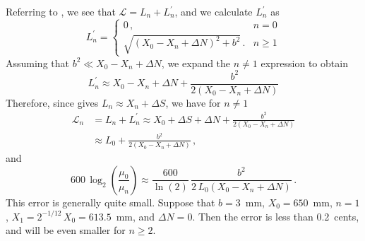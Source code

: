 Referring to , we see that $\mathcal{L} = L_n + L^\prime_n$, and we calculate $L^\prime_n$ as
 \begin{equation}
L^\prime_n = \begin{cases}
0\, , & n =  0 \\
\sqrt{\left(X_0 - X_n + \Delta N\right)^2 + b^2}\, . & n \ge 1
 \end{cases}
 \end{equation}
Assuming that $b^2 \ll X_0 - X_n + \Delta N$, we expand the $n \ne 1$ expression to obtain
 \begin{equation}
L^\prime_n \approx X_0 - X_n + \Delta N + \frac{b^2}{2 \left(X_0 - X_n + \Delta N\right)}
 \end{equation}
Therefore, since  gives $L_n \approx X_n + \Delta S$, we have for $n \ne 1$
 \begin{equation}
 \begin{split}
\mathcal{L}_n &= L_n + L^\prime_n \approx X_0 + \Delta S + \Delta N + \frac{b^2}{2 \left(X_0 - X_n + \Delta N\right)} \\
&\approx L_0 + \frac{b^2}{2 \left(X_0 - X_n + \Delta N\right)}\, ,
 \end{split}
 \end{equation}
and
 \begin{equation}
600\, \log_2 \left( \frac{\mu_0}{\mu_n} \right) \approx \frac{600}{\ln(2)}\, \frac{b^2}{2\, L_0 \left(X_0 - X_n + \Delta N\right)}\, .
 \end{equation}
This error is generally quite small. Suppose that $b = 3$~mm, $X_0 = 650$~mm, $n = 1$, $X_1 = 2^{-1/12}\, X_0 = 613.5$~mm, and $\Delta N = 0$. Then the error is less than 0.2~cents, and will be even smaller for $n \ge 2$.